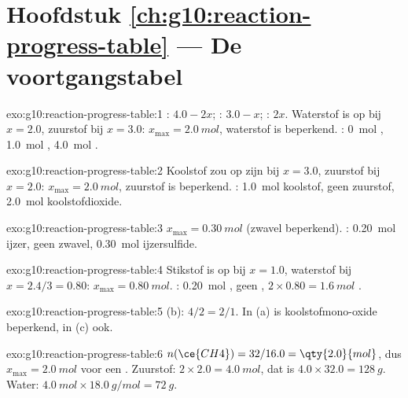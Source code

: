 \section*{Hoofdstuk \ref{ch:g10:reaction-progress-table} --- De voortgangstabel}

\begin{solution}{exo:g10:reaction-progress-table:1}
: $4.0 - 2x$; : $3.0 - x$; : $2x$. Waterstof is op
bij $x = 2.0$, zuurstof bij $x = 3.0$: $x_{\max} = \qty{2.0}{mol}$,
waterstof is beperkend. : \qty{0}{mol} ,
\qty{1.0}{mol} , \qty{4.0}{mol} .
\end{solution}

\begin{solution}{exo:g10:reaction-progress-table:2}
Koolstof zou op zijn bij $x = 3.0$, zuurstof bij $x = 2.0$:
$x_{\max} = \qty{2.0}{mol}$, zuurstof is beperkend. :
\qty{1.0}{mol} koolstof, geen zuurstof, \qty{2.0}{mol} koolstofdioxide.
\end{solution}

\begin{solution}{exo:g10:reaction-progress-table:3}
$x_{\max} = \qty{0.30}{mol}$ (zwavel beperkend). :
\qty{0.20}{mol} ijzer, geen zwavel, \qty{0.30}{mol} ijzersulfide.
\end{solution}

\begin{solution}{exo:g10:reaction-progress-table:4}
Stikstof is op bij $x = 1.0$, waterstof bij $x = 2.4/3 = 0.80$:
$x_{\max} = \qty{0.80}{mol}$. : \qty{0.20}{mol} , geen
, $2 \times 0.80 = \qty{1.6}{mol}$ .
\end{solution}

\begin{solution}{exo:g10:reaction-progress-table:5}
(b): $4/2 = 2/1$. In (a) is koolstofmono-oxide beperkend, in (c) ook.
\end{solution}

\begin{solution}{exo:g10:reaction-progress-table:6}
$n(\ce{CH4}) = 32 / 16.0 = \qty{2.0}{mol}$, dus $x_{\max} = \qty{2.0}{mol}$
voor een . Zuurstof: $2 \times 2.0 = \qty{4.0}{mol}$,
dat is $4.0 \times 32.0 = \qty{128}{g}$. Water:
$\qty{4.0}{mol} \times \qty{18.0}{g/mol} = \qty{72}{g}$.
\end{solution}

